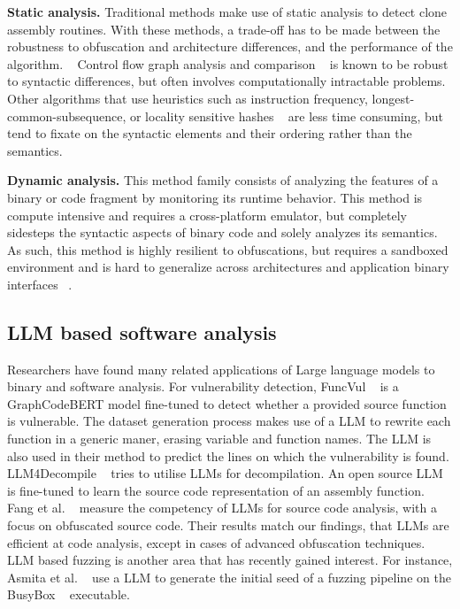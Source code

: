 \textbf{Static analysis.} Traditional methods make use of static analysis to detect clone assembly routines. With these methods, a trade-off has
to be made between the robustness to obfuscation and architecture differences, and the performance of the algorithm. ~\cite{BCSDsurvey}
Control flow graph analysis and comparison ~\cite{BinDiff,graph-bug-search} is known to be robust to syntactic differences, but often
involves computationally intractable problems. Other algorithms that use heuristics such as instruction frequency,
longest-common-subsequence, or locality sensitive hashes ~\cite{clones.net,op-seq,sem-hash} are less time consuming, but tend to fixate on the syntactic
elements and their ordering rather than the semantics.

\textbf{Dynamic analysis.} This method family consists of analyzing the features of a binary or code fragment by monitoring its runtime behavior.
This method is compute intensive and requires a cross-platform emulator, but completely sidesteps the syntactic aspects of binary code
and solely analyzes its semantics. ~\cite{BCSD} As such, this method is highly resilient to obfuscations, but requires a sandboxed environment
and is hard to generalize across architectures and application binary interfaces ~\cite{blanket-exec}.

\subsection{LLM based software analysis}

Researchers have found many related applications of Large language models to binary and software analysis.
For vulnerability detection, FuncVul ~\cite{funcVul} is a GraphCodeBERT model fine-tuned to detect whether a provided
source function is vulnerable. The dataset generation process makes use of a LLM to rewrite each function in a generic maner,
erasing variable and function names. The LLM is also used in their method to predict the lines on which the vulnerability is found.
LLM4Decompile ~\cite{llm4decompile} tries to utilise LLMs for decompilation. An open source LLM is fine-tuned to learn the source code
representation of an assembly function. Fang et al. ~\cite{source-analysis} measure the competency of LLMs for source code analysis,
with a focus on obfuscated source code. Their results match our findings, that LLMs are efficient at code analysis, except in cases
of advanced obfuscation techniques. LLM based fuzzing is another area that has recently gained interest. For instance,
Asmita et al. ~\cite{llm-fuzz} use a LLM to generate the initial seed of a fuzzing pipeline on the BusyBox ~\cite{busybox} executable.

